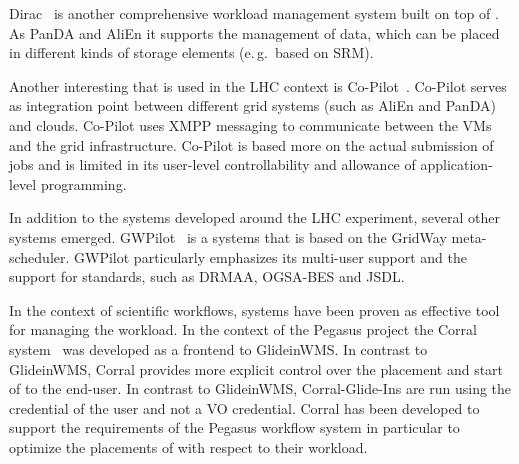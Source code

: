 \documentclass{sig-alternate}
\begin{document}
Dirac~\cite{1742-6596-219-6-062049} is another comprehensive workload
management system built on top of \pilots. As PanDA and AliEn it supports the
management of data, which can be placed in different kinds of storage elements
(e.\,g.\ based on SRM).

Another interesting \pilot that is used in the LHC context is
Co-Pilot~\cite{copilot-tr}. Co-Pilot serves as integration point between
different grid \pilotjob systems (such as AliEn and PanDA) and clouds.
Co-Pilot uses XMPP messaging to communicate between the VMs and the grid
infrastructure. Co-Pilot is based more on the actual submission of jobs and is
limited in its user-level controllability and allowance of application-level
programming.

In addition to the \pilotjob systems developed around the LHC experiment,
several other systems emerged. GWPilot~\cite{gwpilot} is a \pilot systems that
is based on the GridWay meta-scheduler. GWPilot particularly emphasizes its
multi-user support and the support for standards, such as DRMAA, OGSA-BES and
JSDL.





In the context of scientific workflows, \pilotjob systems have been
proven as effective tool for managing the workload. In the context of
the Pegasus project the Corral
system~\cite{Rynge:2011:EUG:2116259.2116599} was developed as a
frontend to GlideinWMS. In contrast to GlideinWMS, Corral provides
more explicit control over the placement and start of \pilots to the
end-user. In contrast to GlideinWMS, Corral-Glide-Ins are run using
the credential of the user and not a VO credential. Corral has been
developed to support the requirements of the Pegasus workflow system
in particular to optimize the placements of \pilots with respect to
their workload.
\end{document}
